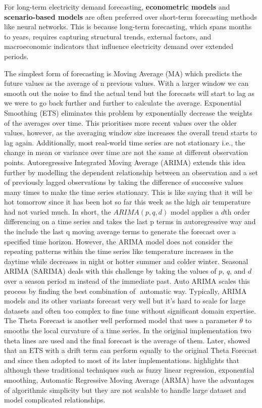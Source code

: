 \documentclass[mstat,12pt]{unswthesis}
\begin{document}
For long-term electricity demand forecasting, \textbf{econometric
models} and \textbf{scenario-based models} are often preferred over
short-term forecasting methods like neural networks. This is because
long-term forecasting, which spans months to years, requires capturing
structural trends, external factors, and macroeconomic indicators that
influence electricity demand over extended periods.

The simplest form of forecasting is Moving Average (MA) which predicts
the future values as the average of n previous values. With a larger
window we can smooth out the noise to find the actual tend but the
forecasts will start to lag as we were to go back further and further to
calculate the average. Exponential Smoothing (ETS) eliminates this
problem by exponentially decrease the weights of the averages over time.
This prioritises more recent values over the older values, however, as
the averaging window size increases the overall trend starts to lag
again. Additionally, most real-world time series are not stationary
i.e., the change in mean or variance over time are not the same at
different observation points. Autoregressive Integrated Moving Average
(ARIMA) \cite{box1970time} extends this idea further by modelling the
dependent relationship between an observation and a set of previously
lagged observations by taking the difference of successive values many
times to make the time series stationary. This is like saying that it
will be hot tomorrow since it has been hot so far this week as the high
air temperature had not varied much. In short, the \(ARIMA(p, q, d)\)
model applies a \(d\)th order differencing on a time series and takes
the last p terms in autoregressive way and the include the last q moving
average terms to generate the forecast over a specified time horizon.
However, the ARIMA model does not consider the repeating patterns within
the time series like temperature increases in the daytime while
decreases in night or hotter summer and colder winter. Seasonal ARIMA
(SARIMA) \cite{box1970time} deals with this challenge by taking the
values of \(p\), \(q\), and \(d\) over a season period m instead of the
immediate past. Auto ARIMA \cite{Hyndman2008} scales this process by
finding the best combination of \(<p, q, d>\) automatic way. Typically,
ARIMA models and its other variants forecast very well but it's hard to
scale for large datasets and often too complex to fine tune without
significant domain expertise. The Theta Forecast
\cite{assimakopoulos2000theta} is another well performed model that uses
a parameter \(\theta\) to smooths the local curvature of a time series.
In the original implementation two theta lines are used and the final
forecast is the average of them. Later, \cite{hyndman2002forecasting}
showed that an ETS with a drift term can perform equally to the original
Theta Forecast and since then adopted to most of its later
implementations. \cite{Wang2021} highlights that although these
traditional techniques such as fuzzy linear regression, exponential
smoothing, Automatic Regressive Moving Average (ARMA) have the
advantages of algorithmic simplicity but they are not scalable to handle
large dataset and model complicated relationships.
\end{document}
